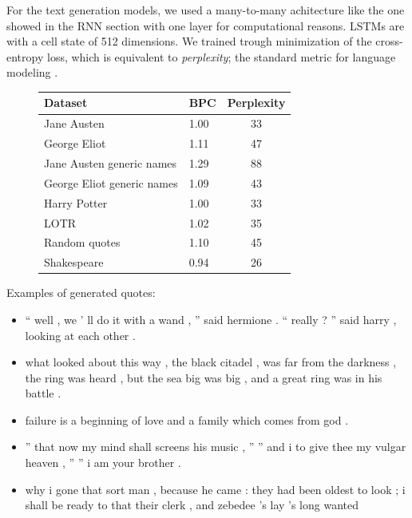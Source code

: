 For the text generation models, we used a many-to-many achitecture like 
the one showed in the RNN section with one layer for computational reasons.
LSTMs are with a cell state of 512 dimensions. We trained trough minimization 
of the cross-entropy loss, which is equivalent to \textit{perplexity}; the 
standard metric for language modeling \cite{gravesGenerating}.

\begin{figure}[htbp!]
\begin{tabular}{|l|l|c|}
\hline
Dataset & BPC & Perplexity \\
\hline
Jane Austen & 1.00 & 33 \\
George Eliot& 1.11 & 47 \\
Jane Austen generic names & 1.29  & 88 \\
George Eliot generic names & 1.09 & 43\\
Harry Potter & 1.00 & 33 \\
LOTR & 1.02 & 35 \\
Random quotes & 1.10 & 45 \\
Shakespeare & 0.94 & 26\\
\hline
\end{tabular}
\end{figure}

Examples of generated quotes:
\begin{itemize}\compresslist
    \item `` well , we ' ll do it with a wand , '' said hermione . `` really ?
      '' said harry , looking at each other .
    \item  what looked about this
      way , the black citadel , was far from the
          darkness , the ring was heard , but the sea big was big , and a great
          ring was in his battle .
    \item failure is a beginning of love and a family which comes from god .
    \item  '' that now my mind shall screens his music , '' '' and i to give
      thee my vulgar heaven , '' '' i am your brother .
    \item why i gone that sort man , because he came : they had been oldest to
        look ; i shall be ready to that their clerk , and zebedee 's lay 's long wanted
\end{itemize}
